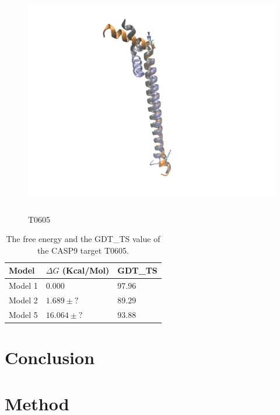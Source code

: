 \documentclass[12pt]{article}
\begin{document}
\begin{figure}
\begin{center}
\includegraphics[width=12cm,height=10cm]{T0605.pdf}
\end{center}
\caption{T0605}
\label{fig:T0605}
\end{figure}


\begin{table}
\caption{The free energy and the GDT\_TS value of the CASP9 target T0605.}
\label{tab:T0605}
\begin{center}
\begin{tabular}{l l l}\hline
Model   &     $\Delta G$ (Kcal/Mol) &  GDT\_TS \\ \hline
Model 1 &     $0.000$ &  $97.96$    \\
Model 2 &     $1.689 \pm ?$ &  $89.29$    \\
Model 5 &     $16.064 \pm ?$ & $93.88$   \\ \hline
\end{tabular}
\end{center}
\end{table}



\section{Conclusion}



\section{Method}
\end{document}
